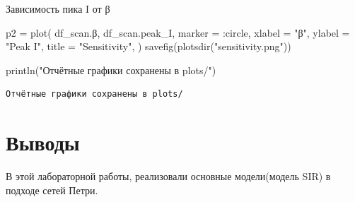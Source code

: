 \documentclass[
  12pt,
  a4paper,
  DIV=11,
  numbers=noendperiod]{scrreprt}
\newenvironment{Shaded}{\begin{snugshade}}{\end{snugshade}}
\newcommand{\FunctionTok}[1]{\textcolor[rgb]{0.28,0.35,0.67}{#1}}
\newcommand{\NormalTok}[1]{\textcolor[rgb]{0.00,0.23,0.31}{#1}}
\newcommand{\OperatorTok}[1]{\textcolor[rgb]{0.37,0.37,0.37}{#1}}
\newcommand{\StringTok}[1]{\textcolor[rgb]{0.13,0.47,0.30}{#1}}
\begin{document}
Зависимость пика I от β

\begin{Shaded}
\begin{Highlighting}[]
\NormalTok{p2 }\OperatorTok{=} \FunctionTok{plot}\NormalTok{(}
\NormalTok{    df\_scan.β,}
\NormalTok{    df\_scan.peak\_I,}
\NormalTok{    marker }\OperatorTok{=} \OperatorTok{:}\NormalTok{circle,}
\NormalTok{    xlabel }\OperatorTok{=} \StringTok{"β"}\NormalTok{,}
\NormalTok{    ylabel }\OperatorTok{=} \StringTok{"Peak I"}\NormalTok{,}
\NormalTok{    title }\OperatorTok{=} \StringTok{"Sensitivity"}\NormalTok{,}
\NormalTok{    )}
\FunctionTok{savefig}\NormalTok{(}\FunctionTok{plotsdir}\NormalTok{(}\StringTok{"sensitivity.png"}\NormalTok{))}

\FunctionTok{println}\NormalTok{(}\StringTok{"Отчётные графики сохранены в plots/"}\NormalTok{)}
\end{Highlighting}
\end{Shaded}

\begin{verbatim}
Отчётные графики сохранены в plots/
\end{verbatim}

\chapter{Выводы}\label{ux432ux44bux432ux43eux434ux44b}

В этой лабораторной работы, реализовали основные модели(модель SIR) в
подходе сетей Петри.


\printbibliography
\end{document}
